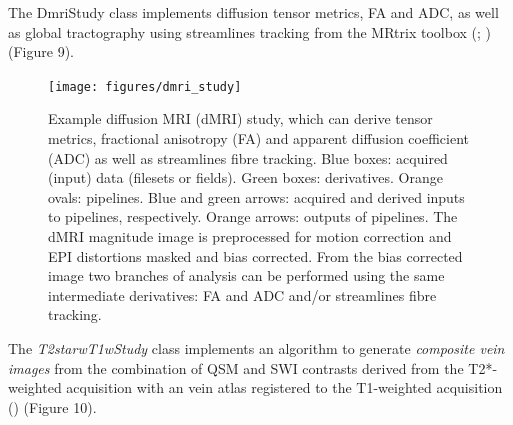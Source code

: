 The DmriStudy class implements diffusion tensor metrics, FA and ADC, as
well as global tractography using streamlines tracking from the MRtrix
toolbox (\cite{tournier_improved_2010}; \cite{tournier_mrtrix:_2012}) (Figure 9).


\begin{figure}
  \begin{center}
    \texttt{[image: figures/dmri\_study]}
  \caption{Example diffusion MRI (dMRI) study, which can derive
tensor metrics, fractional anisotropy (FA) and apparent diffusion
coefficient (ADC) as well as streamlines fibre tracking. Blue boxes:
acquired (input) data (filesets or fields). Green boxes: derivatives.
Orange ovals: pipelines. Blue and green arrows: acquired and derived
inputs to pipelines, respectively. Orange arrows: outputs of pipelines.
The dMRI magnitude image is preprocessed for motion correction and EPI
distortions masked and bias corrected. From the bias corrected image two
branches of analysis can be performed using the same intermediate
derivatives: FA and ADC and/or streamlines fibre tracking.}
\end{center}
\label{fig:dmri_study}
\end{figure}

The \emph{T2starwT1wStudy} class implements an algorithm to generate
\emph{composite vein images} from the combination of QSM and SWI
contrasts derived from the T2*-weighted acquisition with an vein atlas
registered to the T1-weighted acquisition (\cite{ward_combining_2018}) (Figure 10).


